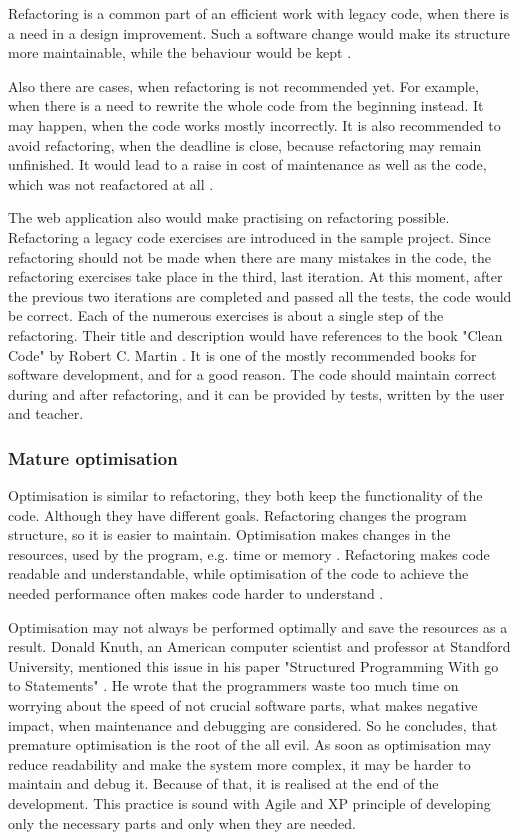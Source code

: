 Refactoring is a common part of an efficient work with legacy code, when there is a need in a design improvement. Such a software change would make its structure more maintainable, while the behaviour would be kept \cite{lc_effectively}.

Also there are cases, when refactoring is not recommended yet. For example, when there is a need to rewrite the whole code from the beginning instead. It may happen, when the code works mostly incorrectly. It is also recommended to avoid refactoring, when the deadline is close, because refactoring may remain unfinished. It would lead to a raise in cost of maintenance as well as the code, which was not reafactored at all \cite[Preface]{ref_debt}.

The web application also would make practising on refactoring possible. Refactoring a legacy code exercises are introduced in the sample project. Since refactoring should not be made when there are many mistakes in the code, the refactoring exercises take place in the third, last iteration. At this moment, after the previous two iterations are completed and passed all the tests, the code would be correct. Each of the numerous exercises is about a single step of the refactoring. Their title and description would have references to the book "Clean Code" by Robert C. Martin \cite{clean_code}. It is one of the mostly recommended books for software development, and for a good reason. The code should maintain correct during and after refactoring, and it can be provided by tests, written by the user and teacher.

\subsubsection{Mature optimisation}
Optimisation is similar to refactoring, they both keep the functionality of the code. Although they have different goals. Refactoring changes the program structure, so it is easier to maintain. Optimisation makes changes in the resources, used by the program, e.g. time or memory \cite{lc_effectively}. Refactoring makes code readable and understandable, while optimisation of the code to achieve the needed performance often makes code harder to understand \cite{ref_ec}.

Optimisation may not always be performed optimally and save the resources as a result. Donald Knuth, an American computer scientist and professor at Standford University, mentioned this issue in his paper "Structured Programming With go to Statements" \cite{knuth_goto}. He wrote that the programmers waste too much time on worrying about the speed of not crucial software parts, what makes negative impact, when maintenance and debugging are considered. So he concludes, that premature optimisation is the root of the all evil. As soon as optimisation may reduce readability and make the system more complex, it may be harder to maintain and debug it. Because of that, it is realised at the end of the development. This practice is sound with Agile and XP principle of developing only the necessary parts and only when they are needed.

